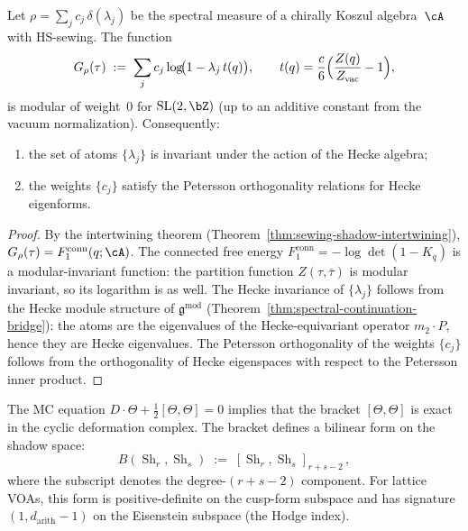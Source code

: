 \begin{proposition}%
\label{prop:modularity-constraint}%
\ClaimStatusConditional%
%
%
Let $\rho = \sum_j c_j\,\delta(\lambda_j)$ be the spectral measure
of a chirally Koszul algebra~$\cA$ with HS-sewing. The function
\begin{equation}\label{eq:modularity-constraint-G}
G_\rho(\tau)
\;:=\;
\sum_j c_j \log\!\bigl(1 - \lambda_j\, t(q)\bigr),
\qquad
t(q) = \frac{c}{6}\Bigl(\frac{Z(q)}{Z_{\mathrm{vac}}} - 1\Bigr),
\end{equation}
is modular of weight~$0$ for $\mathrm{SL}(2,\bZ)$ \textup{(}up to an
additive constant from the vacuum normalization\textup{)}.
Consequently:
\begin{enumerate}[label=\textup{(\roman*)}]
\item
the set of atoms $\{\lambda_j\}$ is invariant under the action of the
Hecke algebra\textup;
\item
the weights $\{c_j\}$ satisfy the Petersson orthogonality relations
for Hecke eigenforms.
\end{enumerate}
\end{proposition}

\begin{proof}
By the intertwining theorem
(Theorem~\ref{thm:sewing-shadow-intertwining}),
$G_\rho(\tau) = F_1^{\mathrm{conn}}(q;\cA)$. The connected free energy
$F_1^{\mathrm{conn}} = -\log\det(1 - K_q)$ is a modular-invariant
function: the partition function $Z(\tau,\bar\tau)$ is modular invariant,
so its logarithm is as well. The Hecke invariance of
$\{\lambda_j\}$ follows from the Hecke module structure of
$\mathfrak{g}^{\mathrm{mod}}$
(Theorem~\ref{thm:spectral-continuation-bridge}): the atoms are the
eigenvalues of the Hecke-equivariant operator $m_2 \cdot P$, hence they
are Hecke eigenvalues. The Petersson orthogonality of the weights
$\{c_j\}$ follows from the orthogonality of Hecke eigenspaces with
respect to the Petersson inner product.
\end{proof}

\begin{proposition}%
\label{prop:bracket-hodge-index}%
\ClaimStatusProvedHere%
%
%
The MC equation $D \cdot \Theta + \tfrac12[\Theta,\Theta] = 0$
implies that the bracket $[\Theta,\Theta]$ is exact in the cyclic
deformation complex. The bracket defines a bilinear form on the
shadow space:
\begin{equation}\label{eq:bracket-bilinear-form}
B(\operatorname{Sh}_r, \operatorname{Sh}_s)
\;:=\;
[\operatorname{Sh}_r, \operatorname{Sh}_s]_{r+s-2}\,,
\end{equation}
where the subscript denotes the degree-$(r{+}s{-}2)$ component. For
lattice VOAs, this form is positive-definite on the cusp-form subspace
and has signature $(1, d_{\mathrm{arith}} - 1)$ on the Eisenstein
subspace \textup{(}the Hodge index\textup{)}.
\end{proposition}

